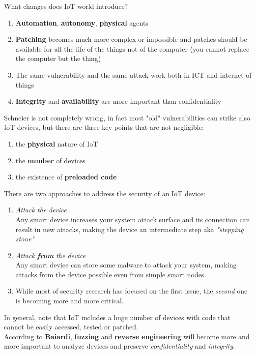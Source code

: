 What changes does IoT world introduce?
\begin{enumerate}
   \item \textbf{Automation}, \textbf{autonomy}, \textbf{physical} agents
   \item \textbf{Patching} becomes much more complex or impossible and
   patches should be available for all the life of the things not of
   the computer (you cannot replace the computer but the thing)
   \item The same vulnerability and the same attack work both in ICT
   and internet of things
   \item \textbf{Integrity} and \textbf{availability} are more important than
   confidentiality
\end{enumerate}

Schneier is not completely wrong,
in fact most "old" vulnerabilities can strike also IoT devices, but there are three key points that are not negligible:
\begin{enumerate}
   \item the \textbf{physical} nature of IoT
   \item the \textbf{number} of devices
   \item the existence of \textbf{preloaded code}
\end{enumerate}
\nl

There are two approaches to address the security of an IoT device:
\begin{enumerate}
   \item \textit{Attack the device}\\
   Any smart device increases your system attack surface and its connection
   can result in new attacks, making the device an intermediate step aka \textit{"stepping stone"}
   \item \textit{Attack \textbf{from} the device}\\
   Any smart device can store some malware to attack your system, making attacks
   from the device possible even from simple smart nodes.
   \nl

   \item[]While most of security research has focused on the first issue, the \textit{second}
   one is becoming more and more critical.
\end{enumerate}

In general, note that IoT includes a huge number of devices with code that cannot be
easily accessed, tested or patched.\\
According to \underline{\color{red}\textbf{Baiardi}}, \textbf{fuzzing} and \textbf{reverse engineering} will become more and more important to
analyze devices and preserve \textit{confidentiality} and \textit{integrity}.

